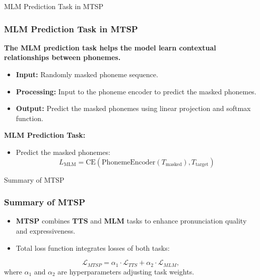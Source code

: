 \begin{frame}{MLM Prediction Task in MTSP}
    \frametitle{MLM Prediction Task in MTSP}
    \textbf{The MLM prediction task helps the model learn contextual relationships between phonemes.}
    \begin{itemize}
        \item \textbf{Input:} Randomly masked phoneme sequence.
        \item \textbf{Processing:} Input to the phoneme encoder to predict the masked phonemes.
        \item \textbf{Output:} Predict the masked phonemes using linear projection and softmax function.
    \end{itemize}
    \textbf{MLM Prediction Task:}
    \begin{itemize}
        \item Predict the masked phonemes:
        \begin{equation}
            L_{\text{MLM}} = \text{CE}(\text{PhonemeEncoder}(T_{\text{masked}}), T_{\text{target}})
        \end{equation}
    \end{itemize}
\end{frame}



\begin{frame}{Summary of MTSP}
    \frametitle{Summary of MTSP}
    \begin{itemize}
        \item \textbf{MTSP} combines \textbf{TTS} and \textbf{MLM} tasks to enhance pronunciation quality and expressiveness.
        \item Total loss function integrates losses of both tasks:
    \end{itemize}
    \begin{equation}
        \mathcal{L}_{MTSP} = \alpha_1 \cdot \mathcal{L}_{TTS} + \alpha_2 \cdot \mathcal{L}_{MLM},
    \end{equation}
    where $\alpha_1$ and $\alpha_2$ are hyperparameters adjusting task weights.
\end{frame}